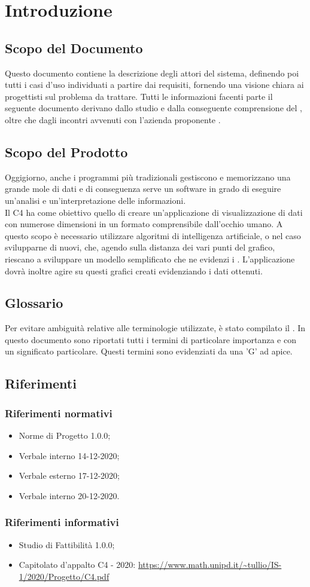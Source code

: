 \section{Introduzione}
\subsection{Scopo del Documento}
Questo documento contiene la descrizione degli attori del sistema, definendo poi tutti i casi d'uso individuati a partire dai requisiti, fornendo una visione chiara ai progettisti sul problema da trattare. Tutti le informazioni facenti parte il seguente documento derivano dallo studio e dalla conseguente comprensione del , oltre che dagli incontri avvenuti con l'azienda proponente \Proponente{}.
\subsection{Scopo del Prodotto}
Oggigiorno, anche i programmi più tradizionali gestiscono e memorizzano una grande mole di dati e di conseguenza serve un software in grado di eseguire un'analisi e un'interpretazione delle informazioni.\\
Il  C4 ha come obiettivo quello di creare un'applicazione di visualizzazione di dati con numerose dimensioni in un formato comprensibile dall'occhio umano.  A questo scopo è necessario utilizzare algoritmi di intelligenza artificiale, o nel caso svilupparne di nuovi, che, agendo sulla distanza dei vari punti del grafico, riescano a sviluppare un modello semplificato che ne evidenzi i . 
L'applicazione dovrà inoltre agire su questi grafici creati evidenziando i dati ottenuti.
\subsection{Glossario}
Per evitare ambiguità relative alle terminologie utilizzate, è stato compilato il . In questo documento sono riportati tutti i termini di particolare importanza e con un significato particolare. Questi termini sono evidenziati da una 'G' ad apice.
\subsection{Riferimenti}
\subsubsection{Riferimenti normativi}
\begin{itemize}
	\item Norme di Progetto 1.0.0;
	\item Verbale interno 14-12-2020;
	\item Verbale esterno 17-12-2020;
	\item Verbale interno 20-12-2020.
\end{itemize}

\subsubsection{Riferimenti informativi}
\begin{itemize}
	\item Studio di Fattibilità 1.0.0;
	\item Capitolato d’appalto C4 - 2020:
	\url{https://www.math.unipd.it/~tullio/IS-1/2020/Progetto/C4.pdf}
\end{itemize}

